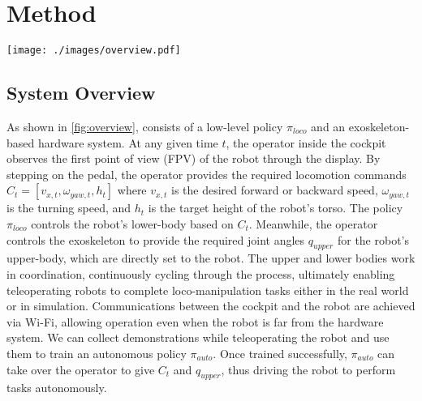 \section{Method}
\label{sec:method}
\begin{figure*}[!ht]
  \centering
  \texttt{[image: ./images/overview.pdf]}
  \caption{\textbf{System Overview.} \textcolor{mycolor}{(a):} how an operator uses the exoskeleton-based hardware system to control humanoid robots in the real world and simulation. \textcolor{mycolor}{(b):} how $\pi_{loco}$ controls the robots, the data collection process for training $\pi_{auto}$, and how $\pi_{auto}$ takes over the operator to control the robots. Communication between the cockpit and the robot is achieved via Wi-Fi.}
  \label{fig:overview}
\end{figure*}

\subsection{System Overview}
As shown in \cref{fig:overview}, \ourshort consists of a low-level policy $\pi_{loco}$ and an exoskeleton-based hardware system. At any given time $t$, the operator inside the cockpit observes the first point of view (FPV) of the robot through the display. By stepping on 
the pedal, the operator provides the required locomotion commands \textbf{$C_t=[v_{x,t}, \omega_{yaw,t}, h_t]$} where $v_{x,t}$ is the desired forward or backward speed, $\omega_{yaw,t}$ is the turning speed, and $h_t$ is the target height of the robot's torso. The policy $\pi_{loco}$ controls the robot's lower-body based on $C_t$. Meanwhile, the operator controls the exoskeleton to provide the required joint angles $q_{upper}$ for the robot's upper-body, which are directly set to the robot. The upper and lower bodies work in coordination, continuously cycling through the process, ultimately enabling teleoperating robots to complete loco-manipulation tasks either in the real world or in simulation. Communications between the cockpit and the robot are achieved via Wi-Fi, allowing operation even when the robot is far from the hardware system. We can collect demonstrations while teleoperating the robot and use them to train an autonomous policy $\pi_{auto}$. Once trained successfully, $\pi_{auto}$ can take over the operator to give $C_t$ and $q_{upper}$, thus driving the robot to perform tasks autonomously.


